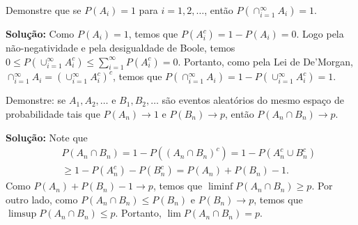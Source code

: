 \begin{frame}

\begin{exem}
Demonstre que se $P(A_i)=1$ para $i=1,2,\ldots$, então $P(\cap_{i=1}^{\infty}A_i)=1$.
\end{exem}
{\bf Solução: } Como $P(A_i)=1$, temos que $P(A_i^c)=1-P(A_i)=0$. Logo pela não-negatividade e pela desigualdade de Boole, temos
$0\leq P(\cup_{i=1}^{\infty}A_i^c)\leq \sum_{i=1}^{\infty}P(A_i^c)=0$. Portanto, como pela Lei de De'Morgan, $\cap_{i=1}^{\infty}A_i=(\cup_{i=1}^{\infty}A_i^c)^c$, temos que
$P(\cap_{i=1}^{\infty}A_i)=1-P(\cup_{i=1}^{\infty}A_i^c)=1$.


\begin{exem}
Demonstre: se $A_1,A_2,\ldots$ e $B_1,B_2,\ldots$ são eventos aleatórios do mesmo espaço de probabilidade tais que
$P(A_n)\rightarrow 1$ e $P(B_n)\rightarrow p$, então $P(A_n\cap B_n)\rightarrow p$.
\end{exem}

{\bf Solução: } Note que
\begin{eqnarray}
& & P(A_n\cap B_n)=1-P((A_n\cap B_n)^c)=1-P(A_n^c\cup B_n^c) \nonumber \\
& & \geq 1-P(A_n^c)-P(B_n^c)=P(A_n)+P(B_n)-1.
\end{eqnarray}
Como $P(A_n)+P(B_n)-1\rightarrow p$, temos que $\liminf P(A_n\cap B_n)\geq p$. Por outro lado, como $P(A_n\cap B_n)\leq P(B_n)$ e $P(B_n)\rightarrow p$, temos que $\limsup P(A_n\cap B_n)\leq p$. Portanto, $\lim P(A_n\cap B_n)=p$.


\end{frame}




